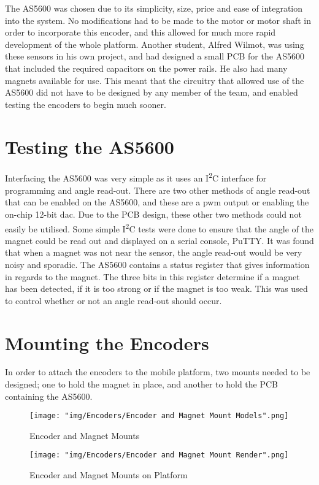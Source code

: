 The AS5600 was chosen due to its simplicity, size, price and ease of integration into the system. No modifications had to be made to the motor or motor shaft in order to incorporate this encoder, and this allowed for much more rapid development of the whole platform.
Another student, Alfred Wilmot, was using these sensors in his own project, and had designed a small PCB for the AS5600 that included the required capacitors on the power rails. He also had many magnets available for use. This meant that the circuitry that allowed use of the AS5600 did not have to be designed by any member of the team, and enabled testing the encoders to begin much sooner.

\section{Testing the AS5600}
Interfacing the AS5600 was very simple as it uses an I\textsuperscript{2}C interface for programming and angle read-out. There are two other methods of angle read-out that can be enabled on the AS5600, and these are a \gls{pwm} output or enabling the on-chip 12-bit \gls{dac}. Due to the PCB design, these other two methods could not easily be utilised. Some simple I\textsuperscript{2}C tests were done to ensure that the angle of the magnet could be read out and displayed on a serial console, PuTTY. It was found that when a magnet was not near the sensor, the angle read-out would be very noisy and sporadic. The AS5600 contains a status register that gives information in regards to the magnet. The three bits in this register determine if a magnet has been detected, if it is too strong or if the magnet is too weak. This was used to control whether or not an angle read-out should occur.

\section{Mounting the Encoders}
In order to attach the encoders to the mobile platform, two mounts needed to be designed; one to hold the magnet in place, and another to hold the PCB containing the AS5600. 

{}


\begin{figure}[htbp]
    \centering
    \texttt{[image: "img/Encoders/Encoder and Magnet Mount Models".png]} 
    \caption{Encoder and Magnet Mounts}
    \label{fig:encodermagnetmountfig}
\end{figure}
\begin{figure}[htbp]
    \centering
    \texttt{[image: "img/Encoders/Encoder and Magnet Mount Render".png]} 
    \caption{Encoder and Magnet Mounts on Platform}
    \label{fig:encodermagnetmountrenderfig}
\end{figure}

